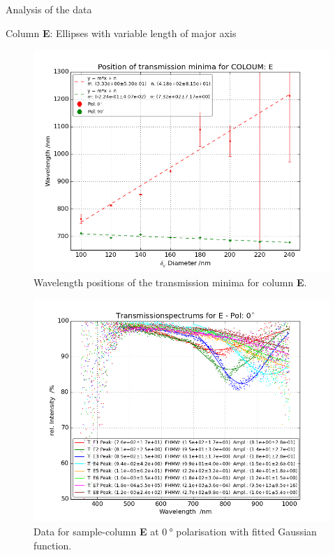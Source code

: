 \documentclass[pdftex, a4paper,11pt, twoside, UKenglish]{report}
\begin{document}
\begin{chapter}{Analysis of the data}
\begin{section}{Column \textbf{E}: Ellipses with variable length of
        major axis}
      \begin{figure}[b!]
        \centering
        \includegraphics[width=\textwidth]{Figures/MinimaPosE.png}
        \caption{Wavelength positions of the transmission minima for column
            \textbf{E}.}
        \label{fig:MinimaPosE}
      \end{figure}
      \newpage
      \begin{figure}[ht!]
        \centering
        \begin{minipage}{.95\textwidth}
          \centering
          \includegraphics[width=\textwidth]
              {Figures/TransspecFIT_EPol0.png}
          \caption{Data for sample-column \textbf{E} at $\SI{0}{\degree}$
              polarisation with fitted Gaussian function.}

\end{minipage}
\end{figure}
\end{section}
\end{chapter}
\end{document}
